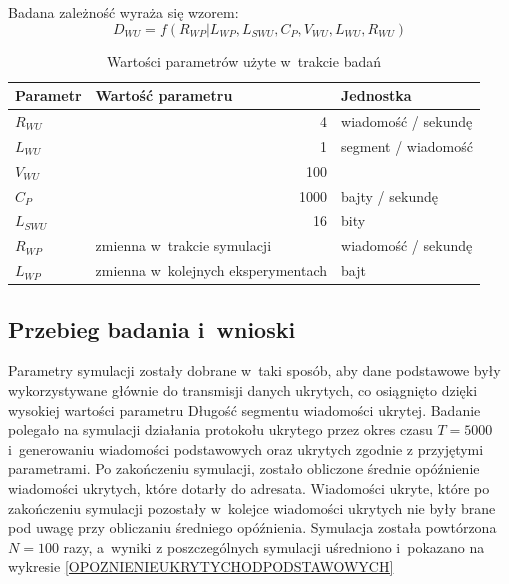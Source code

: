 \documentclass[a4paper, twoside, 12pt]{report}
\begin{document}
            Badana zależność wyraża się wzorem: \\
                $$ D_{WU} = f(R_{WP} | L_{WP}, L_{SWU}, C_P, V_{WU}, L_{WU}, R_{WU}) $$
            \begin{table}[h]
                \centering
                \begin{tabular}{ | l | r | l | }
                    \hline
                    {\bfseries Parametr} & \multicolumn{1}{|l|}{{\bfseries Wartość parametru}} & {\bfseries Jednostka} \\ \hline
                    \( R_{WU} \) & 4 & wiadomość / sekundę \\ \hline
                    \( L_{WU} \) & 1 & segment / wiadomość \\ \hline
                    \( V_{WU} \) & 100 & \\ \hline
                    \( C_P \) & 1000 & bajty / sekundę \\ \hline
                    \( L_{SWU} \) & 16 & bity \\ \hline
                    \( R_{WP} \) & \multicolumn{1}{|l|}{zmienna w~trakcie symulacji} & wiadomość / sekundę \\ \hline
                    \( L_{WP} \) & zmienna w~kolejnych eksperymentach & bajt \\ \hline
                \end{tabular}
                \caption{Wartości parametrów użyte w~trakcie badań}
            \end{table}
        \subsection{Przebieg badania i~wnioski}
            Parametry symulacji zostały dobrane w~taki sposób, aby dane podstawowe
            były wykorzystywane głównie do transmisji danych ukrytych, co osiągnięto
            dzięki wysokiej wartości parametru Długość segmentu wiadomości ukrytej.
            Badanie polegało na symulacji działania protokołu ukrytego przez okres czasu
            \( T = 5000 \) i~generowaniu wiadomości podstawowych oraz ukrytych zgodnie
            z przyjętymi parametrami. Po zakończeniu symulacji, zostało obliczone
            średnie opóźnienie wiadomości ukrytych, które dotarły do adresata. Wiadomości
            ukryte, które po zakończeniu symulacji pozostały w~kolejce wiadomości
            ukrytych nie były brane pod uwagę przy obliczaniu średniego opóźnienia.
            Symulacja została powtórzona \( N = 100 \) razy, a~wyniki z poszczególnych
            symulacji uśredniono i~pokazano na wykresie \ref{OPOZNIENIEUKRYTYCHODPODSTAWOWYCH}
\end{document}

